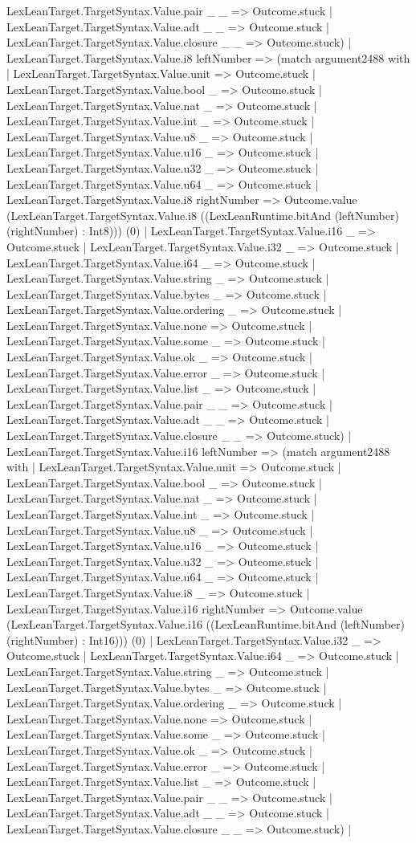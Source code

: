 \documentclass[11pt]{article}
\begin{document}
LexLeanTarget.TargetSyntax.Value.pair \_ \_ => Outcome.stuck | LexLeanTarget.TargetSyntax.Value.adt \_ \_ => Outcome.stuck | LexLeanTarget.TargetSyntax.Value.closure \_ \_ => Outcome.stuck) | LexLeanTarget.TargetSyntax.Value.i8 leftNumber => (match argument2488 with | LexLeanTarget.TargetSyntax.Value.unit => Outcome.stuck | LexLeanTarget.TargetSyntax.Value.bool \_ => Outcome.stuck | LexLeanTarget.TargetSyntax.Value.nat \_ => Outcome.stuck | LexLeanTarget.TargetSyntax.Value.int \_ => Outcome.stuck | LexLeanTarget.TargetSyntax.Value.u8 \_ => Outcome.stuck | LexLeanTarget.TargetSyntax.Value.u16 \_ => Outcome.stuck | LexLeanTarget.TargetSyntax.Value.u32 \_ => Outcome.stuck | LexLeanTarget.TargetSyntax.Value.u64 \_ => Outcome.stuck | LexLeanTarget.TargetSyntax.Value.i8 rightNumber => Outcome.value (LexLeanTarget.TargetSyntax.Value.i8 ((LexLeanRuntime.bitAnd (leftNumber) (rightNumber) : Int8))) (0) | LexLeanTarget.TargetSyntax.Value.i16 \_ => Outcome.stuck | LexLeanTarget.TargetSyntax.Value.i32 \_ => Outcome.stuck | LexLeanTarget.TargetSyntax.Value.i64 \_ => Outcome.stuck | LexLeanTarget.TargetSyntax.Value.string \_ => Outcome.stuck | LexLeanTarget.TargetSyntax.Value.bytes \_ => Outcome.stuck | LexLeanTarget.TargetSyntax.Value.ordering \_ => Outcome.stuck | LexLeanTarget.TargetSyntax.Value.none => Outcome.stuck | LexLeanTarget.TargetSyntax.Value.some \_ => Outcome.stuck | LexLeanTarget.TargetSyntax.Value.ok \_ => Outcome.stuck | LexLeanTarget.TargetSyntax.Value.error \_ => Outcome.stuck | LexLeanTarget.TargetSyntax.Value.list \_ => Outcome.stuck | LexLeanTarget.TargetSyntax.Value.pair \_ \_ => Outcome.stuck | LexLeanTarget.TargetSyntax.Value.adt \_ \_ => Outcome.stuck | LexLeanTarget.TargetSyntax.Value.closure \_ \_ => Outcome.stuck) | LexLeanTarget.TargetSyntax.Value.i16 leftNumber => (match argument2488 with | LexLeanTarget.TargetSyntax.Value.unit => Outcome.stuck | LexLeanTarget.TargetSyntax.Value.bool \_ => Outcome.stuck | LexLeanTarget.TargetSyntax.Value.nat \_ => Outcome.stuck | LexLeanTarget.TargetSyntax.Value.int \_ => Outcome.stuck | LexLeanTarget.TargetSyntax.Value.u8 \_ => Outcome.stuck | LexLeanTarget.TargetSyntax.Value.u16 \_ => Outcome.stuck | LexLeanTarget.TargetSyntax.Value.u32 \_ => Outcome.stuck | LexLeanTarget.TargetSyntax.Value.u64 \_ => Outcome.stuck | LexLeanTarget.TargetSyntax.Value.i8 \_ => Outcome.stuck | LexLeanTarget.TargetSyntax.Value.i16 rightNumber => Outcome.value (LexLeanTarget.TargetSyntax.Value.i16 ((LexLeanRuntime.bitAnd (leftNumber) (rightNumber) : Int16))) (0) | LexLeanTarget.TargetSyntax.Value.i32 \_ => Outcome.stuck | LexLeanTarget.TargetSyntax.Value.i64 \_ => Outcome.stuck | LexLeanTarget.TargetSyntax.Value.string \_ => Outcome.stuck | LexLeanTarget.TargetSyntax.Value.bytes \_ => Outcome.stuck | LexLeanTarget.TargetSyntax.Value.ordering \_ => Outcome.stuck | LexLeanTarget.TargetSyntax.Value.none => Outcome.stuck | LexLeanTarget.TargetSyntax.Value.some \_ => Outcome.stuck | LexLeanTarget.TargetSyntax.Value.ok \_ => Outcome.stuck | LexLeanTarget.TargetSyntax.Value.error \_ => Outcome.stuck | LexLeanTarget.TargetSyntax.Value.list \_ => Outcome.stuck | LexLeanTarget.TargetSyntax.Value.pair \_ \_ => Outcome.stuck | LexLeanTarget.TargetSyntax.Value.adt \_ \_ => Outcome.stuck | LexLeanTarget.TargetSyntax.Value.closure \_ \_ => Outcome.stuck) | 
\end{document}
